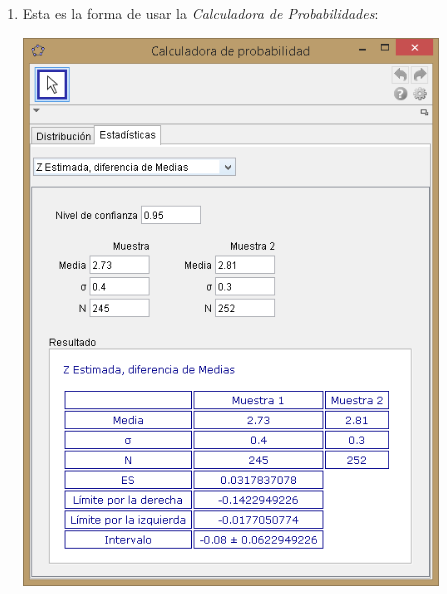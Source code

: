 \documentclass[10pt,a4paper]{article}\usepackage[]{graphicx}\usepackage[]{color}
\makeatletter
\newcommand{\hlnum}[1]{\textcolor[rgb]{0.686,0.059,0.569}{#1}}%
\newcommand{\hlcom}[1]{\textcolor[rgb]{0.678,0.584,0.686}{\textit{#1}}}%
\newcommand{\hlopt}[1]{\textcolor[rgb]{0,0,0}{#1}}%
\newcommand{\hlstd}[1]{\textcolor[rgb]{0.345,0.345,0.345}{#1}}%
\newcommand{\hlkwb}[1]{\textcolor[rgb]{0.69,0.353,0.396}{#1}}%
\newcommand{\hlkwd}[1]{\textcolor[rgb]{0.737,0.353,0.396}{\textbf{#1}}}%
\newenvironment{kframe}{%
 \def\at@end@of@kframe{}%
 \ifinner\ifhmode%
  \def\at@end@of@kframe{\end{minipage}}%
  \begin{minipage}{\columnwidth}%
 \fi\fi%
 \def\FrameCommand##1{\hskip\@totalleftmargin \hskip-\fboxsep
 \colorbox{shadecolor}{##1}\hskip-\fboxsep
     \hskip-\linewidth \hskip-\@totalleftmargin \hskip\columnwidth}%
 \MakeFramed {\advance\hsize-\width
   \@totalleftmargin\z@ \linewidth\hsize
   \@setminipage}}%
 {\par\unskip\endMakeFramed%
 \at@end@of@kframe}
\newenvironment{knitrout}{}{} %
\makeatother
\begin{document}
{\begin{enumerate}
\begin{knitrout}
\begin{kframe}
\begin{alltt}
    \hlcom{# La semianchura del intervalo es:}
    \hlstd{(semianchura} \hlkwb{=} \hlstd{z_alfa2} \hlopt{*} \hlkwd{sqrt}\hlstd{(s1}\hlopt{^}\hlnum{2}\hlopt{/}\hlstd{n1} \hlopt{+} \hlstd{s2}\hlopt{^}\hlnum{2}\hlopt{/}\hlstd{n2))}
\end{alltt}
\begin{verbatim}
## [1] 0.062295
\end{verbatim}
\begin{alltt}
    \hlcom{# El intervalo de confianza es este:}

    \hlstd{(intervalo} \hlkwb{=} \hlstd{xbar1} \hlopt{-} \hlstd{xbar2} \hlopt{+} \hlkwd{c}\hlstd{(}\hlopt{-}\hlnum{1}\hlstd{,} \hlnum{1}\hlstd{)} \hlopt{*} \hlstd{semianchura )}
\end{alltt}
\begin{verbatim}
## [1] -0.142295 -0.017705
\end{verbatim}
\end{kframe}
\end{knitrout}

  \item Esta es la forma de usar la {\em Calculadora de Probabilidades}:
    \begin{center}
    \includegraphics[width=11cm]{../fig/Tut09-09.png}
    \end{center}


\end{enumerate}}
\end{document}
